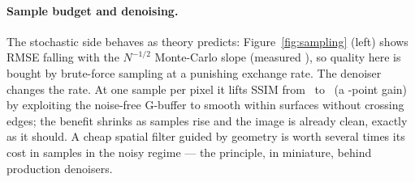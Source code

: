 \paragraph{Sample budget and denoising.} The stochastic side behaves as theory
predicts: Figure~\ref{fig:sampling} (left) shows RMSE falling with the
$N^{-1/2}$ Monte-Carlo slope (measured \McSlope), so quality here is bought by
brute-force sampling at a punishing exchange rate. The denoiser changes the
rate. At one sample per pixel it lifts SSIM from \SsimOneSpp\ to \SsimOneSppDn\
(a \DenoiseGainOne-point gain) by exploiting the noise-free G-buffer to smooth
within surfaces without crossing edges; the benefit shrinks as samples rise and
the image is already clean, exactly as it should. A cheap spatial filter guided
by geometry is worth several times its cost in samples in the noisy regime ---
the principle, in miniature, behind production denoisers.
